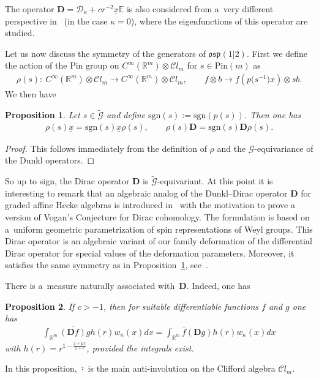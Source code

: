 \documentclass[11pt]{article}
\newtheorem{proposition}{Proposition}
\numberwithin{equation}{section}
\numberwithin{theorem}{section}
\numberwithin{proposition}{section}
\numberwithin{lemma}{section}
\numberwithin{corollary}{section}
\numberwithin{definition}{section}
\numberwithin{example}{section}
\numberwithin{remark}{section}
\numberwithin{note}{section}
\theoremstyle{remark}
\newcommand{\mR}{\mathbb{R}}
\newcommand{\mE}{\mathbb{E}}
\newcommand{\cD}{\mathcal{D}}
\newcommand{\cC}{\mathcal{C}}
\newcommand{\cG}{\mathcal{G}}
\newcommand{\dD}{\textbf{D}}
\newcommand{\ux}{\underline{x}}
\def\k{{\kappa}}
\begin{document}
\begin{remark}
The operator $\dD=\cD_{\k}+c r^{-2}\ux\mE$ is also considered from a~very dif\/ferent
perspective in~\cite{MR2269930} (in the case $\k=0$), where the eigenfunctions of this operator
are studied.
\end{remark}

Let us now discuss the symmetry of the generators of $\mathfrak{osp}(1|2)$.
First we def\/ine the action of the Pin group on $C^{\infty}(\mR^{m})\otimes\cC l_{m}$ for $s\in
\mathrm{Pin}(m)$ as
\begin{gather*}
\rho(s): \ C^{\infty}(\mR^{m}) \otimes \cC l_{m} \rightarrow C^{\infty}(\mR^{m}) \otimes \cC l_{m},\qquad
 f\otimes b \rightarrow f (p\big(s^{-1}\big)x) \otimes s b.
\end{gather*}
We then have
\begin{proposition}\label{equivarianceG}
Let $s\in\widetilde{\cG}$ and define $\mathrm{sgn}(s):=\mathrm{sgn}(p(s))$.
Then one has
\begin{gather*}
\rho(s) \ux = \mathrm{sgn}(s) \ux \rho(s),\qquad
\rho(s) \dD = \mathrm{sgn}(s) \dD \rho(s).
\end{gather*}
\end{proposition}

\begin{proof}
This follows immediately from the def\/inition of $\rho$ and the $\cG$-equivariance of the Dunkl
operators.
\end{proof}

So up to sign, the Dirac operator $\dD$ is $\widetilde{\cG}$-equivariant.
At this point it is interesting to remark that an algebraic analog of the Dunkl--Dirac operator
$\dD$ for
graded af\/f\/ine Hecke algebras is introduced in~\cite{BCT} with the motivation to prove
a version of Vogan's Conjecture for Dirac cohomology.
The formulation is based on a~uniform geometric parametrization of spin
representations of Weyl groups.
This Dirac operator is an algebraic variant of our family deformation of the dif\/ferential Dirac
operator
for special values of the deformation parameters.
Moreover, it satisf\/ies the same symmetry as in Proposition~\ref{equivarianceG}, see~\cite[Lemma~3.4]{BCT}.

There is a~measure naturally associated with~$\dD$.
Indeed, one has

\begin{proposition}\label{partIntProp}
If $c>-1$, then for suitable differentiable functions $f$ and $g$ one has
\begin{gather*}
\int_{\mR^{m}}\overline{(\dD f)}g h(r)w_{\kappa}(x)dx=\int_{\mR^{m}}\overline{f}
(\dD g)h(r)w_{\k}(x)dx
\end{gather*}
with $h(r)=r^{1-\frac{1+\mu c}{1+c}}$, provided the integrals exist.
\end{proposition}
In this proposition, $\bar{\cdot}$ is the main anti-involution on the Clif\/ford algebra $\cC l_{m}$.
\end{document}
